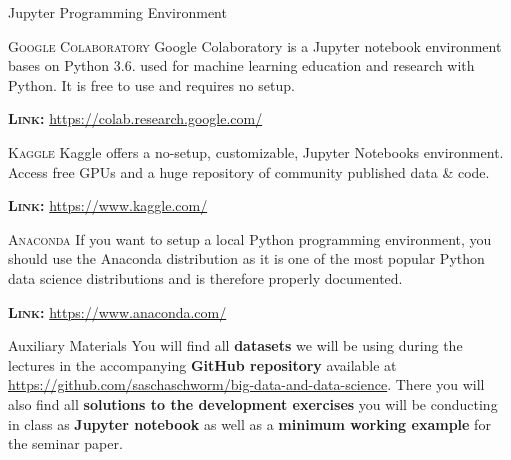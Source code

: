 \documentclass[document.tex]{subfiles}
\begin{document}
    \begin{frame}{Jupyter Programming Environment}
        \begin{alertblock}{\textsc{Google Colaboratory}}
            Google Colaboratory is a Jupyter notebook environment bases on Python 3.6. used for machine learning education and research with Python. It is free to use and requires no setup. 
            \vspace{-1mm}
            
            \textsc{\textbf{Link:}} \href{https://colab.research.google.com/}{https://colab.research.google.com/}
        \end{alertblock}
        \begin{alertblock}{\textsc{Kaggle}}  
            Kaggle offers a no-setup, customizable, Jupyter Notebooks environment. Access free GPUs and a huge repository of community published data \& code.
            \vspace{-1mm}

            \textsc{\textbf{Link:}} \href{https://www.kaggle.com/}{https://www.kaggle.com/}
        \end{alertblock}
        \begin{alertblock}{\textsc{Anaconda}}
            If you want to setup a local Python programming environment, you should use the Anaconda distribution as it is one of the most popular Python data science distributions and is therefore properly documented.
            \vspace{-1mm}
            
            \textsc{\textbf{Link:}} \href{https://www.anaconda.com/}{https://www.anaconda.com/}
        \end{alertblock}
    \end{frame}

    \begin{frame}{Auxiliary Materials}
        You will find all \textbf{datasets} we will be using during the lectures in the accompanying \textbf{GitHub repository} available at \href{https://github.com/saschaschworm/big-data-and-data-science}{https://github.com/saschaschworm/big-data-and-data-science}. There you will also find all \textbf{solutions to the development exercises} you will be conducting in class as \textbf{Jupyter notebook} as well as a \textbf{minimum working example} for the seminar paper.
    \end{frame}
\end{document}
